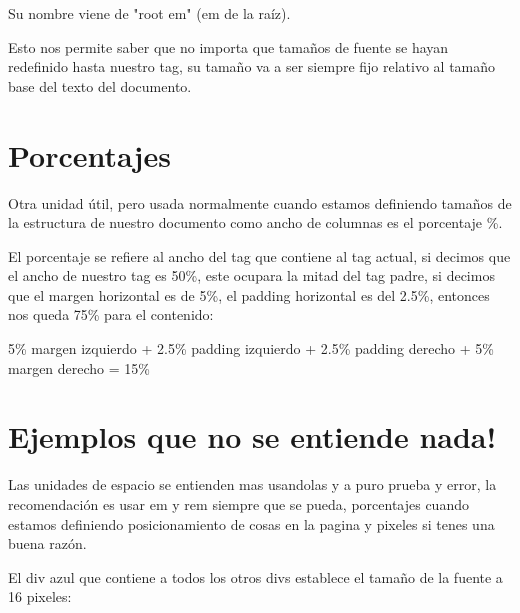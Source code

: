 \documentclass[letterpaper,10pt,spanish]{sphinxmanual}
\begin{document}
Su nombre viene de "root em" (em de la raíz).

Esto nos permite saber que no importa que tamaños de fuente se hayan redefinido
hasta nuestro tag, su tamaño va a ser siempre fijo relativo al tamaño base del
texto del documento.


\section{Porcentajes}
\label{\detokenize{haciendo-lugar:porcentajes}}
Otra unidad útil, pero usada normalmente cuando estamos definiendo tamaños de
la estructura de nuestro documento como ancho de columnas es el porcentaje \%.

El porcentaje se refiere al ancho del tag que contiene al tag actual, si
decimos que el ancho de nuestro tag es 50\%, este ocupara la mitad del tag
padre, si decimos que el margen horizontal es de 5\%, el padding horizontal es
del 2.5\%, entonces nos queda 75\% para el contenido:

5\% margen izquierdo + 2.5\% padding izquierdo + 2.5\% padding derecho + 5\% margen derecho = 15\%


\section{Ejemplos que no se entiende nada!}
\label{\detokenize{haciendo-lugar:ejemplos-que-no-se-entiende-nada}}
Las unidades de espacio se entienden mas usandolas y a puro prueba y error, la
recomendación es usar em y rem siempre que se pueda, porcentajes cuando estamos
definiendo posicionamiento de cosas en la pagina y pixeles si tenes una buena
razón.

El div azul que contiene a todos los otros divs establece el tamaño de la
fuente a 16 pixeles:
\end{document}
